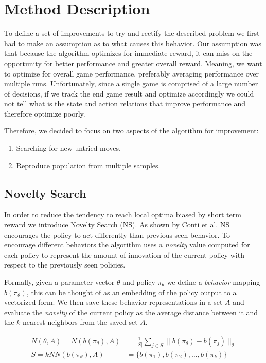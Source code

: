 \documentclass[11 pt, twocolumn]{article}
\begin{document}
\section{Method Description}
To define a set of improvements to try and rectify the described problem we first had to make an assumption as to what causes this behavior. Our assumption was that because the algorithm optimizes for immediate reward, it can miss on the opportunity for better performance and greater overall reward. Meaning, we want to optimize for overall game performance, preferably averaging performance over multiple runs. Unfortunately, since a single game is comprised of a large number of decisions, if we track the end game result and optimize accordingly we could not tell what is the state and action relations that improve performance and therefore optimize poorly.

Therefore, we decided to focus on two aspects of the algorithm for improvement:
\begin{enumerate}
	\item Searching for new untried moves.
	\item Reproduce population from multiple samples.
\end{enumerate}

\subsection{Novelty Search}\label{sec:novelty}
In order to reduce the tendency to reach local optima biased by short term reward we introduce Novelty Search (NS). As shown by Conti et al. NS encourages the policy to act differently than previous seen behavior. To encourage different behaviors the algorithm uses a \emph{novelty} value computed for each policy to represent the amount of innovation of the current policy with respect to the previously seen policies.

Formally, given a parameter vector $\theta$  and policy $\pi_\theta$ we define a \emph{behavior} mapping $b(\pi_\theta)$, this can be thought of as an embedding of the policy output to a vectorized form. We then save these behavior representations in a set $A$ and evaluate the \emph{novelty} of the current policy as the average distance between it and the $k$ nearest neighbors from the saved set $A$.

\begin{align*}
N(\theta, A)=N(b(\pi_\theta),A)&=\frac{1}{|S|}\sum_{j\in S} \|b(\pi_\theta)-b(\pi_j)\|_2\\
S=kNN(b(\pi_\theta),A)&=\{b(\pi_1),b(\pi_2), \dots,b(\pi_k)\}
\end{align*}
\end{document}
